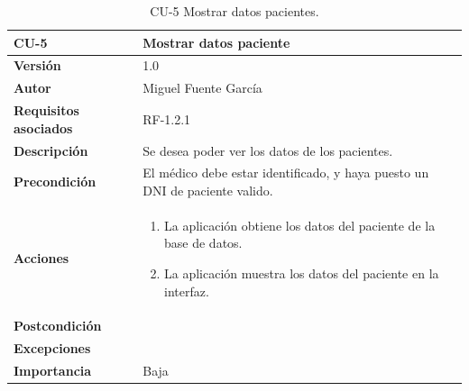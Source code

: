\begin{table}[p]
	\centering
	\begin{tabularx}{\linewidth}{ p{} p{} }
		\toprule
		\textbf{CU-5}    & \textbf{Mostrar datos paciente}\\
		\toprule
		\textbf{Versión}              & 1.0    \\
		\textbf{Autor}                & Miguel Fuente García \\
		\textbf{Requisitos asociados} & RF-1.2.1  \\
		\textbf{Descripción}          & Se desea poder ver los datos de los pacientes. \\
		\textbf{Precondición}         & El médico debe estar identificado, y haya puesto un DNI de paciente valido. \\
		\textbf{Acciones}             &
		\begin{enumerate}
			\def\labelenumi{\arabic{enumi}.}
			\tightlist
			\item La aplicación obtiene los datos del paciente de la base de datos.
            \item La aplicación muestra los datos del paciente en la interfaz.
		\end{enumerate}\\
		\textbf{Postcondición}        &  \\
		\textbf{Excepciones}          &  \\
		\textbf{Importancia}          & Baja  \\
		\bottomrule
	\end{tabularx}
	\caption{CU-5 Mostrar datos pacientes.}
\end{table}

